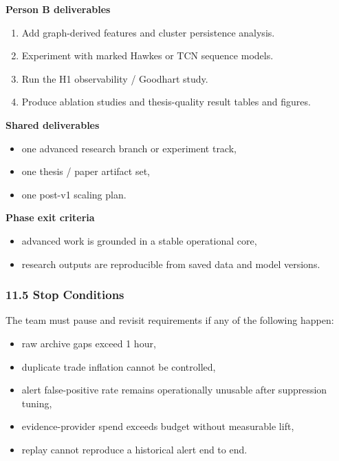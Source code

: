 \documentclass[
]{article}
\providecommand{\tightlist}{%
  \setlength{\itemsep}{0pt}\setlength{\parskip}{0pt}}
\begin{document}
\textbf{Person B deliverables}

\begin{enumerate}
\def\labelenumi{\arabic{enumi}.}
\tightlist
\item
  Add graph-derived features and cluster persistence analysis.
\item
  Experiment with marked Hawkes or TCN sequence models.
\item
  Run the H1 observability / Goodhart study.
\item
  Produce ablation studies and thesis-quality result tables and figures.
\end{enumerate}

\textbf{Shared deliverables}

\begin{itemize}
\tightlist
\item
  one advanced research branch or experiment track,
\item
  one thesis / paper artifact set,
\item
  one post-v1 scaling plan.
\end{itemize}

\textbf{Phase exit criteria}

\begin{itemize}
\tightlist
\item
  advanced work is grounded in a stable operational core,
\item
  research outputs are reproducible from saved data and model versions.
\end{itemize}

\subsubsection{11.5 Stop Conditions}\label{115-stop-conditions}

The team must pause and revisit requirements if any of the following
happen:

\begin{itemize}
\tightlist
\item
  raw archive gaps exceed 1 hour,
\item
  duplicate trade inflation cannot be controlled,
\item
  alert false-positive rate remains operationally unusable after
  suppression tuning,
\item
  evidence-provider spend exceeds budget without measurable lift,
\item
  replay cannot reproduce a historical alert end to end.
\end{itemize}
\end{document}
